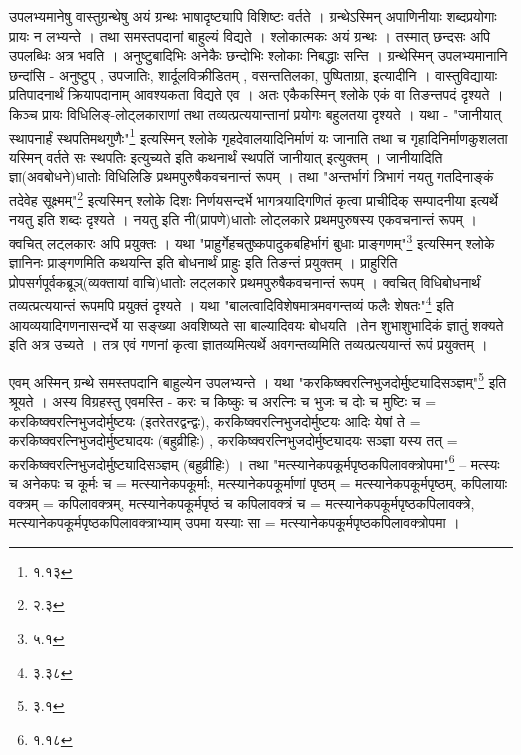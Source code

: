 उपलभ्यमानेषु वास्तुग्रन्थेषु अयं ग्रन्थः भाषादृष्ट्यापि विशिष्टः वर्तते । ग्रन्थेऽस्मिन् अपाणिनीयाः शब्दप्रयोगाः प्रायः न लभ्यन्ते । तथा समस्तपदानां बाहुल्यं विद्यते । श्लोकात्मकः अयं ग्रन्थः । तस्मात् छन्दसः अपि उपलब्धिः अत्र भवति । अनुष्टुबादिभिः अनेकैः छन्दोभिः श्लोकाः निबद्धाः सन्ति । ग्रन्थेस्मिन् उपलभ्यमानानि छन्दांसि - अनुष्टुप् , उपजातिः, शार्दूलविक्रीडितम् , वसन्ततिलका, पुष्पिताग्रा,  इत्यादीनि । वास्तुविद्यायाः प्रतिपादनार्थं क्रियापदानाम् आवश्यकता विद्यते एव । अतः एकैकस्मिन् श्लोके एकं वा तिङन्तपदं दृश्यते । किञ्च प्रायः विधिलिङ्-लोट्लकाराणां तथा तव्यत्प्रत्ययान्तानां प्रयोगः बहुलतया दृश्यते । यथा - "जानीयात् स्थापनार्हं स्थपतिमथगुणैः"\footnote{१.१३} इत्यस्मिन् श्लोके गृहदेवालयादिनिर्माणं यः जानाति तथा च गृहादिनिर्माणकुशलता यस्मिन् वर्तते सः स्थपतिः इत्युच्यते इति कथनार्थं स्थपतिं जानीयात् इत्युक्तम् । जानीयादिति ज्ञा(अवबोधने)धातोः विधिलिङि प्रथमपुरुषैकवचनान्तं रूपम् । तथा "अन्तर्भागं त्रिभागं नयतु गतदिनाङ्कं तदेवेह सूक्ष्मम्"\footnote{२.३} इत्यस्मिन् श्लोके दिशः निर्णयसन्दर्भे भागत्रयादिगणितं कृत्वा प्राचीदिक् सम्पादनीया इत्यर्थे नयतु इति शब्दः दृश्यते । नयतु इति नी(प्रापणे)धातोः लोट्लकारे प्रथमपुरुषस्य एकवचनान्तं रूपम् ।  क्वचित् लट्लकारः अपि प्रयुक्तः । यथा "प्राहुर्गेहचतुष्कपादुकबहिर्भागं बुधाः प्राङ्गणम्"\footnote{५.१} इत्यस्मिन् श्लोके ज्ञानिनः प्राङ्गणमिति कथयन्ति इति बोधनार्थं प्राहुः इति तिङन्तं प्रयुक्तम् । प्राहुरिति प्रोपसर्गपूर्वकब्रूञ्(व्यक्तायां वाचि)धातोः लट्लकारे प्रथमपुरुषैकवचनान्तं रूपम् । क्वचित् विधिबोधनार्थं तव्यत्प्रत्ययान्तं रूपमपि प्रयुक्तं दृश्यते । यथा "बालत्वादिविशेषमात्रमवगन्तव्यं फलैः शेषतः"\footnote{३.३८} इति आयव्ययादिगणनासन्दर्भे या सङ्ख्या अवशिष्यते सा बाल्यादिवयः बोधयति ।तेन शुभाशुभादिकं ज्ञातुं शक्यते इति अत्र उच्यते । तत्र एवं गणनां कृत्वा ज्ञातव्यमित्यर्थे अवगन्तव्यमिति तव्यत्प्रत्ययान्तं रूपं प्रयुक्तम् ।

एवम् अस्मिन् ग्रन्थे समस्तपदानि बाहुल्येन उपलभ्यन्ते । यथा "करकिष्क्वरत्निभुजदोर्मुष्ट्यादिसञ्ज्ञम्"\footnote{३.१} इति श्रूयते । अस्य विग्रहस्तु एवमस्ति - करः च किष्कुः च अरत्निः च भुजः च दोः च मुष्टिः च = करकिष्क्वरत्निभुजदोर्मुष्टयः (इतरेतरद्वन्द्वः), करकिष्क्वरत्निभुजदोर्मुष्टयः आदिः येषां ते = करकिष्क्वरत्निभुजदोर्मुष्ट्यादयः (बहुव्रीहिः) , करकिष्क्वरत्निभुजदोर्मुष्ट्यादयः सञ्ज्ञा यस्य तत् = करकिष्क्वरत्निभुजदोर्मुष्ट्यादिसञ्ज्ञम् (बहुव्रीहिः) । तथा "मत्स्यानेकपकूर्मपृष्ठकपिलावक्त्रोपमा"\footnote{१.१८} – मत्स्यः च अनेकपः च कूर्मः च = मत्स्यानेकपकूर्माः, मत्स्यानेकपकूर्माणां पृष्ठम् = मत्स्यानेकपकूर्मपृष्ठम्, कपिलायाः वक्त्रम् = कपिलावक्त्रम्,  मत्स्यानेकपकूर्मपृष्ठं  च कपिलावक्त्रं च = मत्स्यानेकपकूर्मपृष्ठकपिलावक्त्रे, मत्स्यानेकपकूर्मपृष्ठकपिलावक्त्राभ्याम् उपमा यस्याः सा = मत्स्यानेकपकूर्मपृष्ठकपिलावक्त्रोपमा  ।

